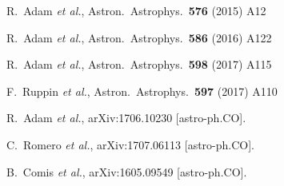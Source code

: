 \begin{thebibliography}{99}
  R.~Adam {\it et al.},
  Astron.\ Astrophys.\  {\bf 576} (2015) A12
  


  R.~Adam {\it et al.},
  Astron.\ Astrophys.\  {\bf 586} (2016) A122
  
  
  R.~Adam {\it et al.},
  Astron.\ Astrophys.\  {\bf 598} (2017) A115



  F.~Ruppin {\it et al.},
  Astron.\ Astrophys.\  {\bf 597} (2017) A110
  
  R.~Adam {\it et al.},
  arXiv:1706.10230 [astro-ph.CO].



  

  C.~Romero {\it et al.},
  arXiv:1707.06113 [astro-ph.CO].
  
  
  B.~Comis {\it et al.},
  arXiv:1605.09549 [astro-ph.CO].
  
  
 








\end{thebibliography}
